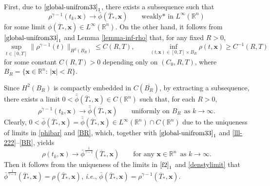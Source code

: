 \documentclass[11pt,reqno]{amsart}
\numberwithin{rk}{section}
\numberwithin{prop}{section}
\numberwithin{mydef}{section}
\numberwithin{lem}{section}
\numberwithin{equation}{section}
\numberwithin{thm}{section}
\begin{document}
First, due to $\eqref{global-unifrom33}_1$, there exists a subsequence such that 
\begin{equation}\label{phibar}
\rho^{\gamma-1}(t_k,\boldsymbol{x})\to  \bar\phi(\overline{T}_*,\boldsymbol{x}) \qquad \text{weakly* in $L^\infty(\mathbb{R}^n)$}
\end{equation}
for some limit  $\phi(\overline{T}_*,\boldsymbol{x}) \in L^\infty(\mathbb{R}^n)$.
On the other hand, it follows from $\eqref{global-unifrom33}_1$ and Lemma \ref{lemma-inf-rho} that,  
for any fixed $R>0$, 
\begin{equation}\label{lll-222}
\sup_{t\in [0,T]}\|\rho^{\gamma-1}(t)\|_{H^2(B_R)}\leq C(R,T),\quad \quad \inf_{(t,\boldsymbol{x})\in [0,T]\times B_R} \rho(t,\boldsymbol{x})\geq C^{-1}(R,T)
\end{equation}
for some constant $C(R,T)>0$ depending only on $(C_0,R,T)$,
where $B_R=\{\boldsymbol{x}\in \mathbb{R}^n:\,|\boldsymbol{x}|< R\}$.

Since $H^2(B_R)$ is compactly embedded in $C(\overline{B_R})$, by extracting a subsequence, 
there exists a limit $0<\bar{\bar\phi}(\overline{T}_*,\boldsymbol{x})\in C(\mathbb{R}^n)$ such that, 
for each $R>0$,
\begin{equation}\label{BR}
\rho^{\gamma-1}(t_k,\boldsymbol{x})\to \bar{\bar\phi}(\overline{T}_*,\boldsymbol{x}) \qquad
\text{uniformly on $B_R$} \ \  \text{as $k\to\infty$}.
\end{equation}
Clearly,  $0<\bar\phi(\overline{T}_*,\boldsymbol{x})=\bar{\bar\phi}(\overline{T}_*,\boldsymbol{x})\in L^\infty(\mathbb{R}^n)\cap C(\mathbb{R}^n)$ due to the uniqueness of limits in \eqref{phibar} and \eqref{BR}, which, together with $\eqref{global-unifrom33}_1$ and  \eqref{lll-222}--\eqref{BR},   yields
\begin{equation} \label{denstylimit}
\rho(t_k,\boldsymbol{x})\to \bar\phi^\frac{1}{\gamma-1}(\overline{T}_*,\boldsymbol{x}) \qquad\text{for any $\boldsymbol{x}\in\mathbb{R}^n$} \,\,\, \text{as $k\to\infty$}. 
\end{equation}
Then it follows from  the uniqueness of the limits in $\eqref{f2}_1$ and \eqref{denstylimit} that  $\bar\phi^\frac{1}{\gamma-1}(\overline{T}_*,\boldsymbol{x})=\rho (\overline{T}_*,\boldsymbol{x})$, {\it i.e.}, $\bar\phi(\overline{T}_*,\boldsymbol{x})=\rho^{\gamma-1} (\overline{T}_*,\boldsymbol{x})$. 
\end{document}
